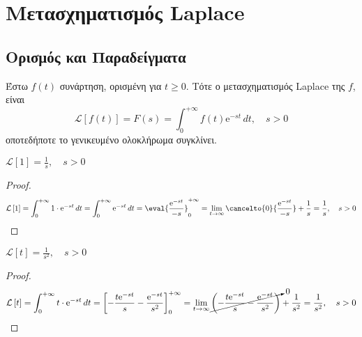 



\geometry{left=15.63mm,right=15.63mm,top=30.25mm, bottom=36.25mm,footskip=24.16mm,
  headsep=24.16mm}

\pagestyle{vangelis}
\everymath{\displaystyle}

\renewcommand{\qedsymbol}{}

{\topsep}{\topsep}%
{}{}%
{\color{Col1}\bfseries}{}%
{\baselineskip}{}%





\chapter*{Μετασχηματισμός Laplace}

\vspace{\baselineskip}


\section*{Ορισμός και Παραδείγματα}

\begin{mybox1}
\begin{dfn}
  Έστω $ f(t) $ συνάρτηση, ορισμένη για $ t \geq 0 $. Τότε ο μετασχηματισμός Laplace 
  της $f$, είναι
  \begin{equation}\label{eq:laplace}
    \mathcal{L} \left[f(t)\right] = F(s) = \int _{0}^{+\infty} f(t) 
    \mathrm{e}^{-st} \,{dt}, \quad s>0
  \end{equation} 
  οποτεδήποτε το γενικευμένο ολοκλήρωμα συγκλίνει.
\end{dfn}
\end{mybox1}

\begin{mybox3}
\begin{example}
  $ {\mathcal{L}\left[1\right] = \frac{1}{s}, \quad s > 0} $
\end{example}
\end{mybox3}
\begin{proof}
  \[
    \mathcal{L}\left[1\right] = \int_{0}^{+\infty} 1\cdot \mathrm{e}^{-st} \,{dt} =  
    \int_{0}^{+\infty} \mathrm{e}^{-st} \,{dt} = \eval{\frac{\mathrm{e}^{-st}}{-s}}
    _{0}^{+\infty} = \lim_{t \to \infty} \cancelto{0}{\frac{\mathrm{e}^{-st}}{-s}} 
    + \frac{1}{s} = \frac{1}{s} , \quad s>0 
  \] 
\end{proof}

\begin{mybox3}
\begin{example}
  $ {\mathcal{L}\left[t\right] = \frac{1}{s^{2}}, \quad s>0} $
\end{example}
\end{mybox3}
\begin{proof}
  \[
    \mathcal{L}\left[t\right] = \int_{0}^{+\infty} t \cdot \mathrm{e}^{-st} \,{dt} = 
    \left[-\frac{t \mathrm{e}^{-st}}{s} - \frac{\mathrm{e}^{-st}}{s^{2}}\right]
    _{0}^{+\infty} = \lim_{t \to \infty} 
    \cancelto{0}{\left(- \frac{t\mathrm{e}^{-st}}{s} -
    \frac{\mathrm{e}^{-st}}{s^{2}}\right)} + \frac{1}{s^{2}} = \frac{1}{s^{2}} , 
    \quad s>0
  \] 
\end{proof}

